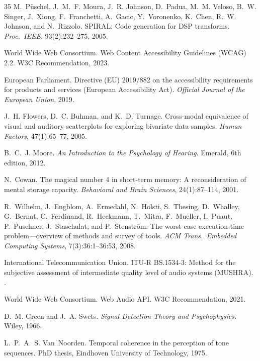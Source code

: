 \documentclass[sigchi, nonacm]{acmart}
\begin{document}
\begin{thebibliography}{35}
M.~P{\"u}schel, J.~M.~F. Moura, J.~R. Johnson, D.~Padua, M.~M. Veloso, B.~W. Singer, J.~Xiong, F.~Franchetti, A.~Gacic, Y.~Voronenko, K.~Chen, R.~W. Johnson, and N.~Rizzolo.
\newblock SPIRAL: Code generation for DSP transforms.
\newblock \emph{Proc.\ IEEE}, 93(2):232--275, 2005.

{World Wide Web Consortium}.
\newblock Web Content Accessibility Guidelines (WCAG) 2.2.
\newblock W3C Recommendation, 2023.

{European Parliament}.
\newblock Directive (EU) 2019/882 on the accessibility requirements for products and services (European Accessibility Act).
\newblock \emph{Official Journal of the European Union}, 2019.

J.~H. Flowers, D.~C. Buhman, and K.~D. Turnage.
\newblock Cross-modal equivalence of visual and auditory scatterplots for exploring bivariate data samples.
\newblock \emph{Human Factors}, 47(1):65--77, 2005.

B.~C.~J. Moore.
\newblock \emph{An Introduction to the Psychology of Hearing}.
\newblock Emerald, 6th edition, 2012.

N.~Cowan.
\newblock The magical number 4 in short-term memory: A reconsideration of mental storage capacity.
\newblock \emph{Behavioral and Brain Sciences}, 24(1):87--114, 2001.

R.~Wilhelm, J.~Engblom, A.~Ermedahl, N.~Holsti, S.~Thesing, D.~Whalley, G.~Bernat, C.~Ferdinand, R.~Heckmann, T.~Mitra, F.~Mueller, I.~Puaut, P.~Puschner, J.~Staschulat, and P.~Stenstr{\"o}m.
\newblock The worst-case execution-time problem---overview of methods and survey of tools.
\newblock \emph{ACM Trans.\ Embedded Computing Systems}, 7(3):36:1--36:53, 2008.

{International Telecommunication Union}.
\newblock ITU-R BS.1534-3: Method for the subjective assessment of intermediate quality level of audio systems (MUSHRA).
.

{World Wide Web Consortium}.
\newblock Web Audio API.
\newblock W3C Recommendation, 2021.

D.~M. Green and J.~A. Swets.
\newblock \emph{Signal Detection Theory and Psychophysics}.
\newblock Wiley, 1966.

L.~P.~A.~S. Van~Noorden.
\newblock Temporal coherence in the perception of tone sequences.
\newblock PhD thesis, Eindhoven University of Technology, 1975.


\end{thebibliography}
\end{document}
